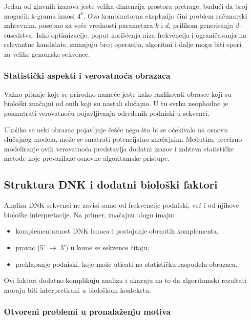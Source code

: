 \documentclass[12pt,oneside]{memoir}
\begin{document}
Jedan od glavnih izazova jeste velika dimenzija prostora pretrage, budući da broj mogućih k-grama iznosi $4^k$. Ova kombinatorna eksplozija čini problem računarski zahtevnim, posebno za veće vrednosti parametara $k$ i $d$, prilikom generisanja $d$-susedstva. Iako optimizacije, poput korišćenja niza frekvencija i ograničavanja na relevantne kandidate, smanjuju broj operacija, algoritmi i dalje mogu biti spori za velike genomske sekvence.

\subsubsection{Statistički aspekti i verovatnoća obrazaca}

Važno pitanje koje se prirodno nameće jeste kako razlikovati obrasce koji su biološki značajni od onih koji su nastali slučajno. U tu svrhu neophodno je posmatrati verovatnoću pojavljivanja određenih podniski u sekvenci.

Ukoliko se neki obrazac pojavljuje češće nego što bi se očekivalo na osnovu slučajnog modela, može se smatrati potencijalno značajnim. Međutim, precizno modeliranje ovih verovatnoća predstavlja dodatni izazov i zahteva statističke metode koje prevazilaze osnovne algoritamske pristupe.

\subsection{Struktura DNK i dodatni biološki faktori}

Analiza DNK sekvenci ne zavisi samo od frekvencije podniski, već i od njihove biološke interpretacije. Na primer, značajnu ulogu imaju:

\begin{itemize}
    \item komplementarnost DNK lanaca i postojanje obrnutih komplementa,
    \item pravac (5' $\rightarrow$ 3') u kome se sekvence čitaju,
    \item preklapanje podniski, koje može uticati na statističku raspodelu obrazaca.
\end{itemize}

Ovi faktori dodatno komplikuju analizu i ukazuju na to da algoritamski rezultati moraju biti interpretirani u biološkom kontekstu.

\subsubsection{Otvoreni problemi u pronalaženju motiva}
\end{document}

